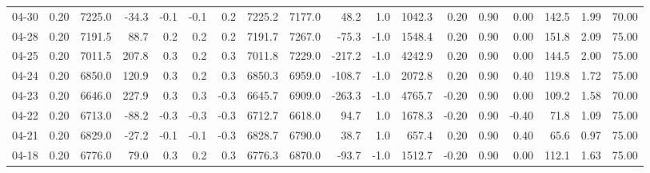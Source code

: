 \begin{threeparttable}
{\begin{tabular}{lrrrrrrrrrrrrrrrrr}
  04-30 &     0.20 & 7225.0 &             -34.3 &              -0.1 &               -0.1 &                0.2 & 7225.2 & 7177.0 &       48.2 &                      1.0 &              1042.3 &       0.20 &      0.90 &           0.00 &            142.5 &            1.99 &                  70.00 \\
  04-28 &     0.20 & 7191.5 &              88.7 &               0.2 &                0.2 &                0.2 & 7191.7 & 7267.0 &      -75.3 &                     -1.0 &              1548.4 &       0.20 &      0.90 &           0.00 &            151.8 &            2.09 &                  75.00 \\
  04-25 &     0.20 & 7011.5 &             207.8 &               0.3 &                0.2 &                0.3 & 7011.8 & 7229.0 &     -217.2 &                     -1.0 &              4242.9 &       0.20 &      0.90 &           0.00 &            144.5 &            2.00 &                  75.00 \\
  04-24 &     0.20 & 6850.0 &             120.9 &               0.3 &                0.2 &                0.3 & 6850.3 & 6959.0 &     -108.7 &                     -1.0 &              2072.8 &       0.20 &      0.90 &           0.40 &            119.8 &            1.72 &                  75.00 \\
  04-23 &     0.20 & 6646.0 &             227.9 &               0.3 &                0.3 &               -0.3 & 6645.7 & 6909.0 &     -263.3 &                     -1.0 &              4765.7 &      -0.20 &      0.90 &           0.00 &            109.2 &            1.58 &                  70.00 \\
  04-22 &     0.20 & 6713.0 &             -88.2 &              -0.3 &               -0.3 &               -0.3 & 6712.7 & 6618.0 &       94.7 &                      1.0 &              1678.3 &      -0.20 &      0.90 &          -0.40 &             71.8 &            1.09 &                  75.00 \\
  04-21 &     0.20 & 6829.0 &             -27.2 &              -0.1 &               -0.1 &               -0.3 & 6828.7 & 6790.0 &       38.7 &                      1.0 &               657.4 &       0.20 &      0.90 &           0.40 &             65.6 &            0.97 &                  75.00 \\
  04-18 &     0.20 & 6776.0 &              79.0 &               0.3 &                0.2 &                0.3 & 6776.3 & 6870.0 &      -93.7 &                     -1.0 &              1512.7 &      -0.20 &      0.90 &           0.00 &            112.1 &            1.63 &                  75.00 \\

\end{tabular}}
\end{threeparttable}
